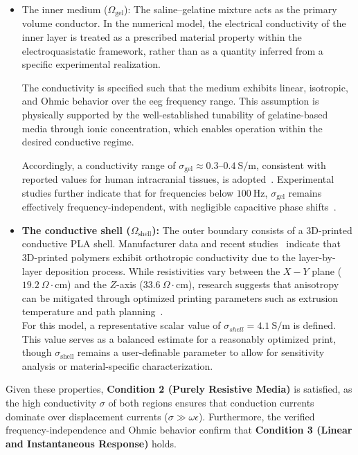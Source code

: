 \begin{itemize}
    \item The inner medium ($\Omega_{\mathrm{gel}}$): The saline--gelatine mixture acts as the primary
    volume conductor. In the numerical model, the electrical conductivity of the inner layer is
    treated as a prescribed material property within the electroquasistatic framework, rather than
    as a quantity inferred from a specific experimental realization.

    The conductivity is specified such that the medium exhibits linear, isotropic, and Ohmic
    behavior over the \gls{eeg} frequency range. This assumption is physically supported by the
    well-established tunability of gelatine-based media through ionic concentration, which enables
    operation within the desired conductive regime.

    Accordingly, a conductivity range of $\sigma_{\mathrm{gel}} \approx 0.3$--$0.4~\mathrm{S/m}$,
    consistent with reported values for human intracranial tissues, is adopted~\cite{akor-2025}.
    Experimental studies further indicate that for frequencies below
    $100~\mathrm{Hz}$, $\sigma_{\mathrm{gel}}$ remains effectively frequency-independent, with
    negligible capacitive phase shifts~\cite{geddes-1967,Chandra2000}.
    \item \textbf{The conductive shell  ($\Omega_{\text{shell}}$):}  The outer boundary consists of a 3D-printed conductive PLA shell. Manufacturer data
    \cite{cpla-datasheet} and recent studies~\cite{akor-2025, tilve-martinez-2024} indicate that 3D-printed polymers exhibit orthotropic conductivity
    due to the layer-by-layer deposition process. While resistivities vary between the $X-Y$ plane ($19.2~\Omega\cdot\text{cm}$) and the $Z$-axis 
    ($33.6~\Omega\cdot\text{cm}$), research suggests that anisotropy can be mitigated through optimized printing parameters such as extrusion
     temperature and path planning~\cite{paz-2020, nowka-2024}. \\                  
    For this model, a representative scalar value of $\sigma_{shell} = 4.1~\text{S/m}$ is defined.
    This value serves as a balanced estimate for a reasonably optimized print, though $\sigma_{\text{shell}}$ remains a user-definable
     parameter to allow for sensitivity analysis or material-specific characterization.
\end{itemize}

Given these properties, \textbf{ Condition 2 (Purely Resistive Media) }is satisfied, as the high conductivity $\sigma$ of both regions ensures that conduction currents dominate over displacement currents ($\sigma \gg \omega\epsilon$). Furthermore, the verified frequency-independence and Ohmic behavior confirm that \textbf{Condition 3 (Linear and Instantaneous Response) }holds.

